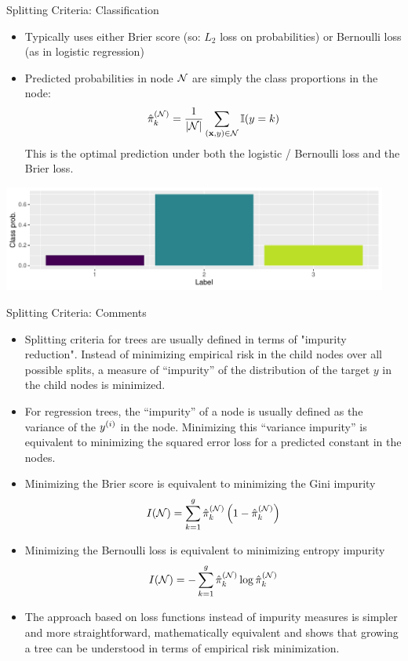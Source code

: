 \begin{vbframe}{Splitting Criteria: Classification}

\begin{itemize}
\item Typically uses either Brier score (so: $L_2$ loss on probabilities) or  Bernoulli loss (as in logistic regression) 
\item Predicted probabilities in node $\mathcal{N}$ are simply the class proportions in the node:
$$ \hat\pi_k^{(\mathcal{N})} = \frac{1}{|\mathcal{N}|} \sum\limits_{(\mathbf{x},y) \in \mathcal{N}} \mathbb{I}(y = k) $$
This is the optimal prediction under both the logistic / Bernoulli loss and the Brier loss.
\end{itemize}

\begin{knitrout}\scriptsize
{}\color{fgcolor}

{\centering \includegraphics[width=0.95\textwidth]{figure/cart_splitcriteria_3} 

}



\end{knitrout}
\end{vbframe}

\begin{vbframe}{Splitting Criteria: Comments}

\begin{itemize}
\item Splitting criteria for trees are usually defined in terms of "impurity reduction". Instead of minimizing empirical risk in the child nodes over all possible splits, a measure of \enquote{impurity} of the distribution of the target $y$ in the child nodes is minimized. 
\item For regression trees, the \enquote{impurity} of a node is usually defined as the variance of the $y^{(i)}$ in the node. Minimizing this \enquote{variance impurity} is equivalent to minimizing the squared error loss for a predicted constant in the nodes. 

\framebreak 

\item Minimizing the Brier score is equivalent to minimizing the Gini impurity
$$I(\mathcal{N}) = \sum\limits_{k=1}^g \hat\pi_k^{(\mathcal{N})} \left( 1-\hat\pi_k^{(\mathcal{N})} \right)$$
\item Minimizing the Bernoulli loss is equivalent to minimizing entropy impurity
$$I(\mathcal{N}) = -\sum\limits_{k=1}^g \hat\pi_k^{(\mathcal{N})} \log \hat\pi_k^{(\mathcal{N})}$$
\item The approach based on loss functions instead of impurity measures is simpler and more straightforward, mathematically equivalent and shows that growing a tree can be understood in terms of empirical risk minimization.
\end{itemize}
\end{vbframe}

